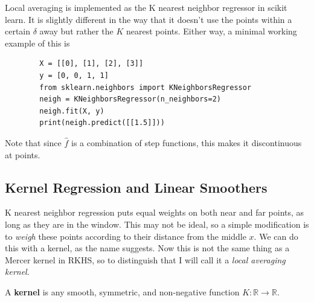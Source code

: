 \documentclass{article}
\begin{document}
    \begin{code}
      Local averaging is implemented as the K nearest neighbor regressor in scikit learn. It is slightly different in the way that it doesn't use the points within a certain $\delta$ away but rather the $K$ nearest points. Either way, a minimal working example of this is 
      \begin{lstlisting}
        X = [[0], [1], [2], [3]]
        y = [0, 0, 1, 1]
        from sklearn.neighbors import KNeighborsRegressor
        neigh = KNeighborsRegressor(n_neighbors=2)
        neigh.fit(X, y)
        print(neigh.predict([[1.5]])) 
      \end{lstlisting}
    \end{code}

    Note that since $\hat{f}$ is a combination of step functions, this makes it discontinuous at points. 

  \subsection{Kernel Regression and Linear Smoothers} 

    K nearest neighbor regression puts equal weights on both near and far points, as long as they are in the window. This may not be ideal, so a simple modification is to \textit{weigh} these points according to their distance from the middle $x$. We can do this with a kernel, as the name suggests. Now this is not the same thing as a Mercer kernel in RKHS, so to distinguish that I will call it a \textit{local averaging kernel}. 

    \begin{definition}
      A \textbf{kernel} is any smooth, symmetric, and non-negative function $K : \mathbb{R} \to \mathbb{R}$.  
    \end{definition}
\end{document}
